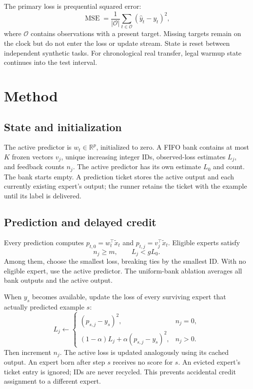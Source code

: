 \documentclass[10pt]{article}
\begin{document}
The primary loss is prequential squared error:
\[
 \operatorname{MSE}=\frac{1}{|\mathcal O|}
 \sum_{t\in\mathcal O}(\hat y_t-y_t)^2,
\]
where $\mathcal O$ contains observations with a present target. Missing targets remain on the clock but do not enter the loss or update stream. State is reset between independent synthetic tasks. For chronological real transfer, legal warmup state continues into the test interval.

\section{Method}
\subsection{State and initialization}
The active predictor is $w_t\in\mathbb R^p$, initialized to zero. A FIFO bank contains at most $K$ frozen vectors $v_j$, unique increasing integer IDs, observed-loss estimates $L_j$, and feedback counts $n_j$. The active predictor has its own estimate $L_0$ and count. The bank starts empty. A prediction ticket stores the active output and each currently existing expert's output; the runner retains the ticket with the example until its label is delivered.

\subsection{Prediction and delayed credit}
Every prediction computes $p_{t,0}=w_t^\top\tilde x_t$ and $p_{t,j}=v_j^\top\tilde x_t$. Eligible experts satisfy
\[
 n_j\geq m,\qquad L_j<gL_0.
\]
Among them, choose the smallest loss, breaking ties by the smallest ID. With no eligible expert, use the active predictor. The uniform-bank ablation averages all bank outputs and the active output.

When $y_s$ becomes available, update the loss of every surviving expert that actually predicted example $s$:
\[
 L_j\leftarrow
 \begin{cases}
 (p_{s,j}-y_s)^2,&n_j=0,\\
 (1-\alpha)L_j+\alpha(p_{s,j}-y_s)^2,&n_j>0.
 \end{cases}
\]
Then increment $n_j$. The active loss is updated analogously using its cached output. An expert born after step $s$ receives no score for $s$. An evicted expert's ticket entry is ignored; IDs are never recycled. This prevents accidental credit assignment to a different expert.
\end{document}
